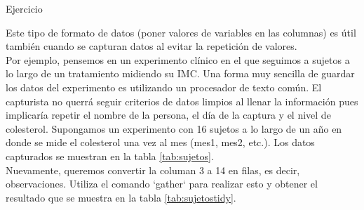 \documentclass[]{article}
\begin{document}
\renewcommand\bcStyleTitre[1]{\large\textcolor{bbblack}{#1}}

\begin{bclogo}[
  couleur=llred,
  arrondi=0,
  logo=\bcstop,
  barre=none,
  noborder=true]{Ejercicio}

Este tipo de formato de datos (poner valores de variables en las columnas) 
es útil también cuando se capturan datos al evitar la repetición de valores. \\

Por ejemplo, pensemos en un experimento clínico en el que seguimos a sujetos
a lo largo de un tratamiento midiendo su IMC. Una forma muy
sencilla de guardar los datos del experimento es utilizando un procesador
de texto común. El capturista no querrá seguir criterios de datos limpios
al llenar la información pues implicaría repetir el nombre de la persona,
el día de la captura y el nivel de colesterol. Supongamos un experimento con
16 sujetos a lo largo de un año en donde se mide el colesterol una vez al mes (mes1, mes2, etc.). Los datos capturados se muestran en la tabla \ref{tab:sujetos}. \\

Nuevamente, queremos convertir la columan 3 a 14 en filas, es decir, observaciones.
Utiliza el comando `gather` para realizar esto y obtener el resultado que se
muestra en la tabla \ref{tab:sujetostidy}.
\end{bclogo}
\end{document}
